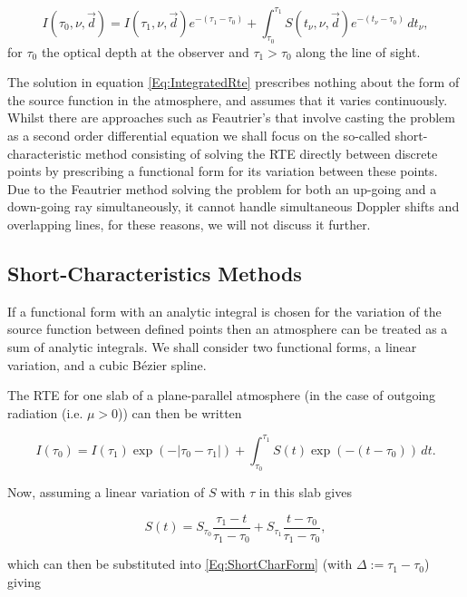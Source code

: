 \begin{equation}
I(\tau_0, \nu, \vec{d}) = I(\tau_1, \nu, \vec{d}) e^{-(\tau_1 - \tau_0)} + \int_{\tau_0}^{\tau_1}S(t_\nu, \nu, \vec{d})e^{-(t_\nu - \tau_0)}\, dt_\nu,
\label{Eq:IntegratedRte}
\end{equation}
for $\tau_0$ the optical depth at the observer and $\tau_1 > \tau_0$ along the line of sight.

The solution in equation \ref{Eq:IntegratedRte} prescribes nothing about the form of the source function in the atmosphere, and assumes that it varies continuously.
Whilst there are approaches such as Feautrier's \NeedRef{} that involve casting the problem as a second order differential equation we shall focus on the so-called short-characteristic method consisting of solving the RTE directly between discrete points by prescribing a functional form for its variation between these points. Due to the Feautrier method solving the problem for both an up-going and a down-going ray simultaneously, it cannot handle simultaneous Doppler shifts and overlapping lines, for these reasons, we will not discuss it further.

\subsection{Short-Characteristics Methods}\label{Sec:ShortChar}

If a functional form with an analytic integral is chosen for the variation of the source function between defined points then an atmosphere can be treated as a sum of analytic integrals. We shall consider two functional forms, a linear variation, and a cubic Bézier spline.

The RTE for one slab of a plane-parallel atmosphere (in the case of outgoing radiation (i.e. $\mu > 0$)) can then be written

\begin{equation}
    I(\tau_0) = I(\tau_1) \exp(- |\tau_0 - \tau_1|) + \int_{\tau_0}^{\tau_1} S(t) \exp(-(t - \tau_0))\, dt.
    \label{Eq:ShortCharForm}
\end{equation}

Now, assuming a linear variation of $S$ with $\tau$ in this slab gives

\begin{equation}
    S(t) = S_{\tau_0} \frac{\tau_1-t}{\tau_1-\tau_0} + S_{\tau_1} \frac{t-\tau_0}{\tau_1-\tau_0},
\end{equation}

which can then be substituted into \eqref{Eq:ShortCharForm} (with $\Delta := \tau_1 - \tau_0$) giving

